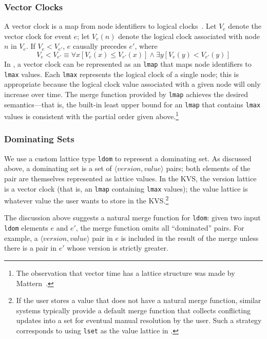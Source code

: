 \subsubsection{Vector Clocks}
A vector clock is a map from node identifiers to logical
clocks~\cite{Fidge1988,Mattern1989}. Let $V_e$ denote the vector clock for event
$e$; let $V_e(n)$ denote the logical clock associated with node $n$ in $V_e$. If
$V_e < V_{e'}$, $e$ causally precedes $e'$, where
\begin{displaymath}
V_e < V_{e'} \equiv \forall x [ V_e(x) \leq V_{e'}(x) ] \land \exists y [ V_e(y) < V_{e'}(y) ]  
\end{displaymath}
In \lang, a vector clock can be represented as an \texttt{lmap} that maps node
identifiers to \texttt{lmax} values. Each \texttt{lmax} represents the logical
clock of a single node; this is appropriate because the logical clock value
associated with a given node will only increase over time. The merge function
provided by \texttt{lmap} achieves the desired semantics---that is, the built-in
least upper bound for an \texttt{lmap} that contains \texttt{lmax} values is
consistent with the partial order given above.\footnote{The observation that
  vector time has a lattice structure was made by Mattern~\cite{Mattern1989}.}

\subsubsection{Dominating Sets}
We use a custom lattice type \texttt{ldom} to represent a dominating set. As
discussed above, a dominating set is a set of
$\langle\textit{version},\textit{value}\rangle$ pairs; both elements of the pair
are themselves represented as lattice values. In the KVS, the version lattice is
a vector clock (that is, an \texttt{lmap} containing \texttt{lmax} values); the
value lattice is whatever value the user wants to store in the KVS.\footnote{If
  the user stores a value that does not have a natural merge function, similar
  systems typically provide a default merge function that collects conflicting
  updates into a set for eventual manual resolution by the user. Such a strategy
  corresponds to using \texttt{lset} as the value lattice in \lang.}

The discussion above suggests a natural merge function for \texttt{ldom}: given
two input \texttt{ldom} elements $e$ and $e'$, the merge function omits all
``dominated'' pairs. For example, a
$\langle\textit{version},\textit{value}\rangle$ pair in $e$ is included in the
result of the merge unless there is a pair in $e'$ whose version is strictly
greater.

